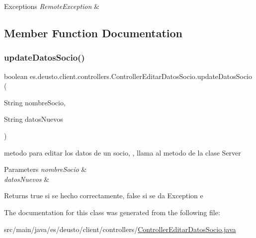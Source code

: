 \begin{DoxyExceptions}{Exceptions}
{\em Remote\+Exception} & \\
\hline
\end{DoxyExceptions}


\subsection{Member Function Documentation}
\mbox{\label{classes_1_1deusto_1_1client_1_1controllers_1_1_controller_editar_datos_socio_a92198bd925a6799c8805e774c9186094}} 
\subsubsection{\texorpdfstring{updateDatosSocio()}{updateDatosSocio()}}
{\footnotesize\ttfamily boolean es.\+deusto.\+client.\+controllers.\+Controller\+Editar\+Datos\+Socio.\+update\+Datos\+Socio (\begin{DoxyParamCaption}\item[{String}]{nombre\+Socio,  }\item[{String}]{datos\+Nuevos }\end{DoxyParamCaption})}

metodo para editar los datos de un socio, , llama al metodo de la clase Server 
\begin{DoxyParams}{Parameters}
{\em nombre\+Socio} & \\
\hline
{\em datos\+Nuevos} & \\
\hline
\end{DoxyParams}
\begin{DoxyReturn}{Returns}
true si se hecho correctamente, false si se da Exception e 
\end{DoxyReturn}


The documentation for this class was generated from the following file\+:\begin{DoxyCompactItemize}
\item 
src/main/java/es/deusto/client/controllers/\mbox{\hyperlink{_controller_editar_datos_socio_8java}{Controller\+Editar\+Datos\+Socio.\+java}}\end{DoxyCompactItemize}
